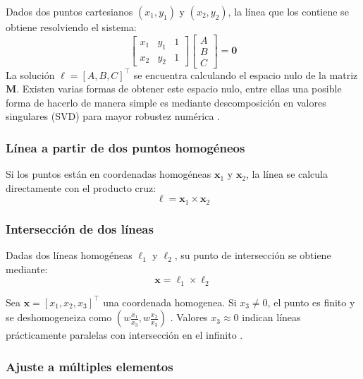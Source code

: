 Dados dos puntos cartesianos $(x_1,y_1)$ y $(x_2,y_2)$, la línea que los contiene se obtiene resolviendo el sistema:
\begin{equation}
	\begin{bmatrix}x_1&y_1&1\\x_2&y_2&1\end{bmatrix}\begin{bmatrix}A\\B\\C\end{bmatrix} = \mathbf{0}
\end{equation}
La solución $\ell=[A,B,C]^\top$ se encuentra calculando el espacio nulo de la matriz $\mathbf{M}$. Existen varias formas de obtener este espacio nulo, entre ellas una posible forma de hacerlo de manera simple es mediante descomposición en valores singulares (SVD) para mayor robustez numérica \cite{golub2013matrix}.

\subsubsection{Línea a partir de dos puntos homogéneos}

Si los puntos están en coordenadas homogéneas $\mathbf{x}_1$ y $\mathbf{x}_2$, la línea se calcula directamente con el producto cruz:
\begin{equation}
	\ell = \mathbf{x}_1 \times \mathbf{x}_2
\end{equation}

\subsubsection{Intersección de dos líneas}
Dadas dos líneas homogéneas $\ell_1$ y $\ell_2$, su punto de intersección se obtiene mediante:
\begin{equation}
	\mathbf{x} = \ell_1 \times \ell_2
\end{equation}

      
Sea $\mathbf{x}=[x_1,x_2,x_3]^\top$ una coordenada homogenea. Si $x_3 \neq 0$, el punto es finito y se deshomogeneiza como $(w\frac{x_1}{x_3}, w\frac{x_2}{x_3})$ . Valores $x_3 \approx 0$ indican líneas prácticamente paralelas con intersección en el infinito \cite{hartley2003multiple}.

\subsubsection{Ajuste a múltiples elementos} \label{sec:ajuste-multiples-elementos}


